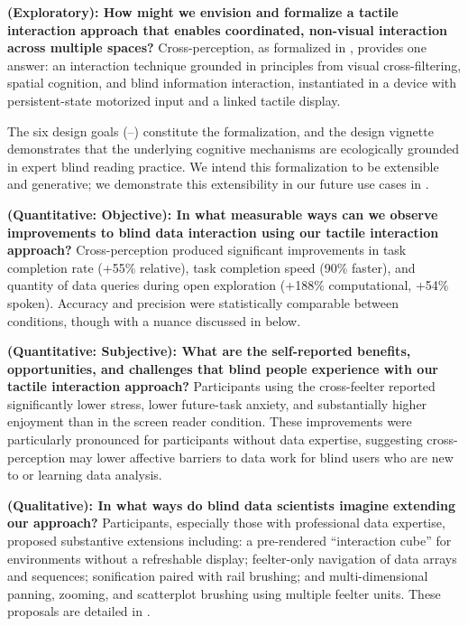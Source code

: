 \documentclass[12pt]{cmuthesis}
\begin{document}
\textbf{ (Exploratory): How might we envision and formalize a tactile interaction approach that enables coordinated, non-visual interaction across multiple spaces?} Cross-perception, as formalized in , provides one answer: an interaction technique grounded in principles from visual cross-filtering, spatial cognition, and blind information interaction, instantiated in a device with persistent-state motorized input and a linked tactile
display.

The six design goals (--) constitute the formalization, and the design vignette demonstrates that the underlying cognitive mechanisms are ecologically grounded in expert blind reading practice. We intend this formalization to be extensible and generative; we demonstrate this extensibility in our future use cases in .

\noindent\textbf{ (Quantitative: Objective): In what measurable ways can we observe improvements to blind data interaction using our tactile interaction approach?} Cross-perception produced significant improvements in task completion rate (+55\% relative), task completion speed (90\% faster), and quantity of data queries during open exploration (+188\% computational, +54\% spoken). Accuracy and precision were statistically comparable between conditions, though with a nuance discussed in  below.

\noindent\textbf{ (Quantitative: Subjective): What are the self-reported benefits, opportunities, and challenges that blind people experience with our tactile interaction approach?} Participants using the cross-feelter reported significantly lower stress, lower future-task anxiety, and substantially higher enjoyment than in the screen reader condition. These improvements were particularly pronounced for participants without data expertise, suggesting cross-perception may lower affective barriers to data work for blind users who are new to or learning data analysis.

\noindent\textbf{ (Qualitative): In what ways do blind data scientists imagine extending our approach?} Participants, especially those with professional data expertise, proposed substantive extensions including: a pre-rendered ``interaction cube'' for environments without a refreshable display; feelter-only navigation of data arrays and sequences; sonification paired with rail brushing; and multi-dimensional panning, zooming, and scatterplot brushing using multiple feelter units. These proposals are detailed in . 
\end{document}
